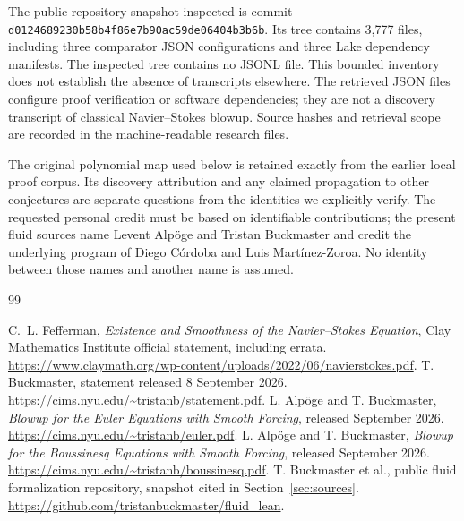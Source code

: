 \documentclass[11pt,a4paper]{article}
\theoremstyle{definition}
\theoremstyle{remark}
\begin{document}
The public repository snapshot inspected is commit
\nolinkurl{d0124689230b58b4f86e7b90ac59de06404b3b6b}.
Its tree contains 3,777 files, including three comparator JSON configurations
and three Lake dependency manifests. The inspected tree contains no JSONL
file. This bounded inventory does not establish the absence of transcripts
elsewhere. The retrieved JSON files configure proof verification or software
dependencies; they are not a discovery transcript of classical
Navier--Stokes blowup. Source hashes and retrieval scope are recorded in the
machine-readable research files.

The original polynomial map used below is retained exactly from the earlier
local proof corpus. Its discovery attribution and any claimed propagation to
other conjectures are separate questions from the identities we explicitly
verify. The requested personal credit must be based on identifiable
contributions; the present fluid sources name Levent Alp\"oge and Tristan
Buckmaster and credit the underlying program of Diego C\'ordoba and Luis
Mart\'inez-Zoroa. No identity between those names and another name is assumed.






























\begin{thebibliography}{99}


 C.~L. Fefferman,
\emph{Existence and Smoothness of the Navier--Stokes Equation},
Clay Mathematics Institute official statement, including errata.
\url{https://www.claymath.org/wp-content/uploads/2022/06/navierstokes.pdf}.
 T. Buckmaster, statement released 8 September 2026.
\url{https://cims.nyu.edu/~tristanb/statement.pdf}.
 L. Alp\"oge and T. Buckmaster,
\emph{Blowup for the Euler Equations with Smooth Forcing}, released September 2026.
\url{https://cims.nyu.edu/~tristanb/euler.pdf}.
 L. Alp\"oge and T. Buckmaster,
\emph{Blowup for the Boussinesq Equations with Smooth Forcing}, released September 2026.
\url{https://cims.nyu.edu/~tristanb/boussinesq.pdf}.
 T. Buckmaster et al., public fluid formalization repository,
snapshot cited in Section~\ref{sec:sources}.
\url{https://github.com/tristanbuckmaster/fluid_lean}.
\end{thebibliography}

\end{document}
